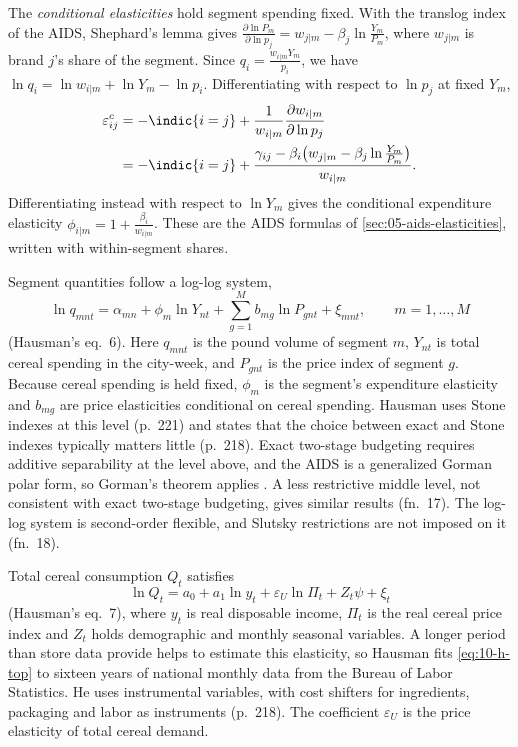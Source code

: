 The \emph{conditional elasticities} hold segment spending fixed. With the translog index of the AIDS,
Shephard's lemma gives $\frac{\partial\ln P_{m}}{\partial\ln p_j} = w_{j|m} - \beta_j\ln\frac{Y_m}{P_m}$, where
$w_{j|m}$ is brand $j$'s share of the segment. Since $q_i = \frac{w_{i|m}Y_m}{p_i}$, we have
$\ln q_i = \ln w_{i|m} + \ln Y_m - \ln p_i$. Differentiating with respect to $\ln p_j$ at fixed $Y_m$,
\begin{align}
  \varepsilon^c_{ij} &= -\indic\{i = j\} + \frac{1}{w_{i|m}}\frac{\partial w_{i|m}}{\partial\ln p_j}\notag\\
  &= -\indic\{i = j\} + \frac{\gamma_{ij} - \beta_i\bigl(w_{j|m} - \beta_j\ln\frac{Y_m}{P_m}\bigr)}{w_{i|m}}.
  \label{eq:10-h-cond-elast}
\end{align}
Differentiating instead with respect to $\ln Y_m$ gives the conditional expenditure elasticity
$\phi_{i|m} = 1 + \frac{\beta_i}{w_{i|m}}$. These are the AIDS formulas of \cref{sec:05-aids-elasticities},
written with within-segment shares.

Segment quantities follow a log-log system,
\begin{equation}\label{eq:10-h-middle}
  \ln q_{mnt} = \alpha_{mn} + \phi_m\ln Y_{nt} + \sum_{g=1}^{M}b_{mg}\ln P_{gnt} + \xi_{mnt}, \qquad m = 1,\dots,M
\end{equation}
(Hausman's eq.~6). Here $q_{mnt}$ is the pound volume of segment $m$, $Y_{nt}$ is total cereal spending in
the city-week, and $P_{gnt}$ is the price index of segment $g$. Because cereal spending is held fixed,
$\phi_m$ is the segment's expenditure elasticity and $b_{mg}$ are price elasticities conditional on cereal
spending. Hausman uses Stone indexes at this level (p.~221) and states that the choice between exact and
Stone indexes typically matters little (p.~218). Exact two-stage budgeting requires additive separability at the level above, and the
AIDS is a generalized Gorman polar form, so Gorman's theorem applies \citep[fn.~17]{Hausman1997}. A less
restrictive middle level, not consistent with exact two-stage budgeting, gives similar results (fn.~17).
The log-log system is second-order flexible, and Slutsky restrictions are not imposed on it (fn.~18).

Total cereal consumption $Q_t$ satisfies
\begin{equation}\label{eq:10-h-top}
  \ln Q_t = a_0 + a_1\ln y_t + \varepsilon_U\ln\Pi_t + Z_t\psi + \xi_t
\end{equation}
(Hausman's eq.~7), where $y_t$ is real disposable income, $\Pi_t$ is the real cereal price index and $Z_t$
holds demographic and monthly seasonal variables. A longer period than store data provide helps to estimate
this elasticity, so Hausman fits \eqref{eq:10-h-top} to sixteen years of national monthly data from the Bureau
of Labor Statistics. He uses
instrumental variables, with cost shifters for ingredients, packaging and labor as instruments (p.~218). The
coefficient $\varepsilon_U$ is the price elasticity of total cereal demand.

